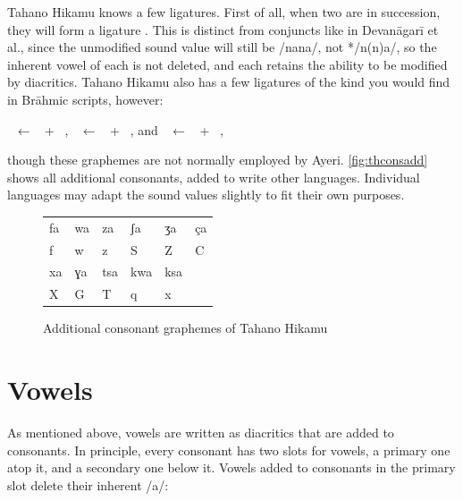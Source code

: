 Tahano Hikamu knows a few ligatures. First of all, when two   
are in succession, they will form a ligature  . This is 
distinct from conjuncts like in Devanāgarī et al., since the unmodified sound 
value will still be /nana/, not */n(n)a/, so the inherent vowel of each  
 is not deleted, and each   retains the ability to be 
modified by diacritics. Tahano Hikamu also has a few ligatures of the kind you 
would find in Brāhmic scripts, however:

\pex
	\a {}~ ← ~ + ~, 
	\a {}~ ← ~ + ~, and 
	\a {}~ ← ~ + ~,
\xe

\noindent though these graphemes are not normally employed by Ayeri. 
\autoref{fig:thconsadd} shows all additional consonants, added to write other 
languages. Individual languages may adapt the sound values slightly to fit their 
own purposes.

\begin{figure}[ht]
\caption{Additional consonant graphemes of Tahano Hikamu}

\begin{tabu} to \linewidth{X[c] X[c] X[c] X[c] X[c] X[c]}
\toprule
\tableheaderfont	fa & wa & za & ʃa & ʒa & ça \\
\rowfont{\Tagati\huge}	f & w & z & S & Z & C \\

\midrule

\tableheaderfont	xa & ɣa & tsa & kwa & ksa \\
\rowfont{\Tagati\huge}	X & G & T & q & x \\

\bottomrule
\end{tabu}
\label{fig:thconsadd}
\end{figure}


\section{Vowels}

As mentioned above, vowels are written as diacritics that are added to 
consonants. In principle, every consonant has two slots for vowels, a primary 
one atop it, and a secondary one below it. Vowels added to consonants in 
the primary slot delete their inherent /a/:

